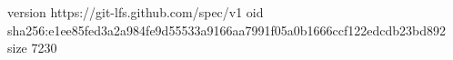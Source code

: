 version https://git-lfs.github.com/spec/v1
oid sha256:e1ee85fed3a2a984fe9d55533a9166aa7991f05a0b1666ccf122edcdb23bd892
size 7230
